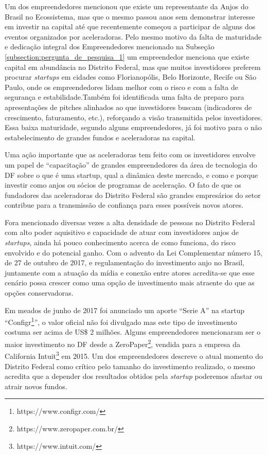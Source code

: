Um dos empreendedores mencionou que existe um representante da Anjos do Brasil no Ecossistema, mas que o mesmo passou anos sem demonstrar interesse em investir na capital até que recentemente começou a participar de alguns dos eventos organizados por aceleradoras. Pelo mesmo motivo da falta de maturidade e dedicação integral dos Empreendedores mencionado na Subseção \ref{subsection:pergunta_de_pesquisa_1} um empreendedor menciona que existe capital em abundância no Distrito Federal, mas que muitos investidores preferem procurar \textit{startups} em cidades como Florianopólis, Belo Horizonte, Recife ou São Paulo, onde os empreendedores lidam melhor com o risco e com a falta de segurança e estabilidade.Também foi identificada uma falta de preparo para apresentações de pitches alinhados ao que investidores buscam (indicadores de crescimento, faturamento, etc.), reforçando a visão transmitida pelos investidores. Essa baixa maturidade, segundo alguns empreendedores, já foi motivo para o não estabelecimento de grandes fundos e aceleradoras na capital.

Uma ação importante que as aceleradoras tem feito com os investidores envolve um papel de ``capacitação'' de grandes empreendedores da área de tecnologia do DF sobre o que é uma startup, qual a dinâmica deste mercado, e como e porque investir como anjos ou sócios de programas de aceleração. O fato de que os fundadores das aceleradoras do Distrito Federal são grandes empresários do setor contribue para a transmissão de confiança para esses possíveis novos atores. 

Fora mencionado diversas vezes a alta densidade de pessoas no Distrito Federal com alto poder aquisitivo e capacidade de atuar com investidores anjos de \textit{startups}, ainda há pouco conhecimento acerca de como funciona, do risco envolvido e do potencial ganho. Com o advento da Lei Complementar número 15, de 27 de outubro de 2017, e regulamentação do investimento anjo no Brasil, juntamente com a atuação da mídia e conexão entre atores acredita-se que esse cenário possa crescer como uma opção de investimento mais atraente do que as opções conservadoras.

Em meados de junho de 2017 foi anunciado um aporte ``Serie A'' na startup ``Configr\footnote{https://www.configr.com/}'', o valor oficial não foi divulgado mas este tipo de investimento costuma ser acima de US\$ 2 milhões. Alguns empreendedores mencionaram ser o maior investimento no DF desde a ZeroPaper\footnote{https://www.zeropaper.com.br/}, vendida para a empresa da California Intuit\footnote{https://www.intuit.com/} em 2015. Um dos empreendedores descreve o atual momento do Distrito Federal como crítico pelo tamanho do investimento realizado, o mesmo acredita que a depender dos resultados obtidos pela \textit{startup} poderemos afastar ou atrair novos fundos.

